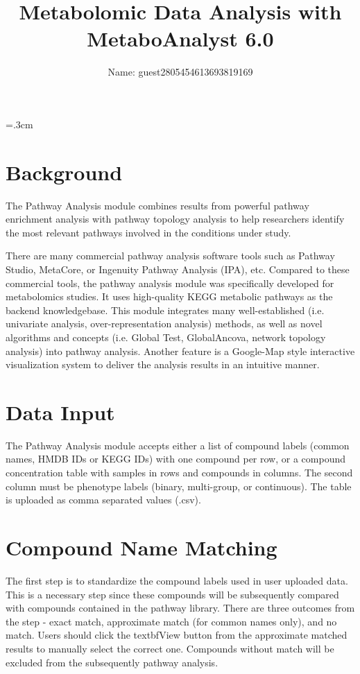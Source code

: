 \documentclass[a4paper]{article}
\title{Metabolomic Data Analysis with MetaboAnalyst 6.0}
\author{ Name: guest2805454613693819169 }
\begin{document}
\parskip=.3cm
\maketitle
\section{Background}
 The Pathway Analysis module combines results from powerful pathway  enrichment analysis with pathway topology analysis to help researchers identify the most relevant pathways involved in the conditions under study. 

 There are many commercial pathway analysis software tools such as Pathway Studio, MetaCore, or Ingenuity Pathway Analysis (IPA), etc. Compared to these commercial tools, the pathway analysis module was specifically developed  for metabolomics studies. It uses high-quality KEGG metabolic pathways as the backend knowledgebase.  This module integrates many well-established (i.e. univariate analysis, over-representation analysis) methods, as well as novel algorithms and concepts (i.e. Global Test, GlobalAncova, network topology analysis) into pathway analysis. Another feature is a Google-Map style interactive visualization system to deliver  the analysis results in an intuitive manner.
\section{Data Input}
 The Pathway Analysis module accepts either a list of compound labels (common names, HMDB IDs or KEGG IDs) with one compound per row,  or a compound concentration table with samples in rows and compounds in columns. The second column must be  phenotype labels (binary, multi-group, or continuous). The table is uploaded as comma separated values (.csv). 

\section{Compound Name Matching}

The first step is to standardize the compound labels used in user uploaded data. This is a necessary step since
these compounds will be subsequently compared with compounds contained in the pathway library.
There are three outcomes from the step - exact match, approximate match (for common names only), and no match.
Users should click the textbf{View} button from the approximate matched results to manually select the correct one.
Compounds without match will be excluded from the subsequently pathway analysis.
\end{document}
